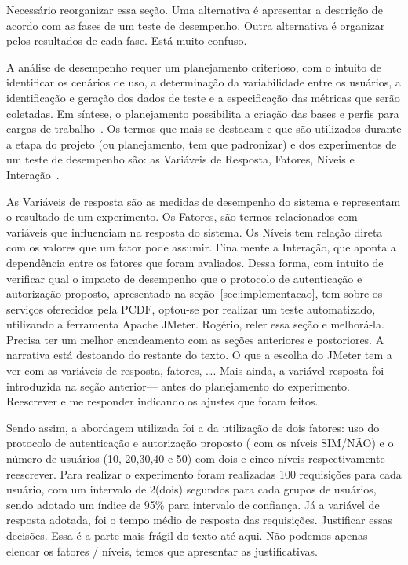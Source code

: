 {\color{red}Necess\'{a}rio reorganizar essa se\c c\~{a}o. Uma alternativa \'{e} apresentar a descri\c c\~{a}o de acordo com as fases de um teste de desempenho. Outra alternativa \'{e} organizar
pelos resultados de cada fase. Est\'{a} muito confuso.}

{\color{red}A an\'{a}lise de desempenho requer um planejamento criterioso, com o intuito de} identificar os cenários de uso, a determinação da variabilidade entre os usuários, a identificação e geração dos dados de teste e a especificação das métricas que serão coletadas. Em síntese, o planejamento possibilita a cria\c c\~{a}o das bases e
perfis para cargas de trabalho~\cite{Meier2007}. Os termos que mais se destacam e que são utilizados durante a etapa do {\color{red} projeto (ou planejamento, tem que padronizar)}
e dos experimentos de um teste de desempenho são: as Variáveis de Resposta, Fatores, Níveis e Interação~\cite{jain1991art}.

As Variáveis de resposta são as medidas de desempenho do sistema e representam o resultado de um experimento. Os Fatores, são termos relacionados com variáveis que influenciam na resposta do sistema. Os Níveis tem relação direta com os valores que um fator pode assumir. Finalmente a Interação, que aponta a dependência entre os fatores que foram avaliados.
Dessa forma, com intuito de verificar qual o impacto de desempenho que o protocolo de autenticação e autorização proposto, apresentado na seção~\ref{sec:implementacao}, tem sobre os serviços oferecidos pela PCDF, optou-se por realizar um teste automatizado, utilizando a ferramenta Apache JMeter. {\color{red}Rog\'{e}rio, reler essa se\c c\~{a}o e melhor\'{a}-la. Precisa
ter um melhor encadeamento com as se\c c\~{o}es anteriores e postoriores. A narrativa est\'{a} destoando do restante do texto. O que a escolha do JMeter tem a ver com as vari\'{a}veis de resposta, fatores, \ldots. Mais ainda, a vari\'{a}vel resposta foi introduzida na se\c c\~{a}o anterior--- antes do planejamento do experimento. Reescrever e me responder indicando os ajustes que foram feitos}.

Sendo assim, a abordagem utilizada foi a da utilização de dois fatores: uso do protocolo de autenticação e autorização proposto ({\color{red} com os n\'{i}veis SIM/NÃO})
e o número de usuários (10, 20,30,40 e 50) com dois e cinco níveis respectivamente {\color{red}reescrever}.
Para realizar o experimento foram realizadas 100 requisições para cada usuário, com um intervalo de 2(dois) segundos para cada grupos de usuários, sendo adotado um índice de 95\% para intervalo de confiança. Já a variável de resposta adotada, foi o tempo médio de resposta das requisições. {\color{red}Justificar essas decis\~{o}es. Essa \'{e} a parte mais fr\'{a}gil do texto
at\'{e} aqui. N\~{a}o podemos apenas elencar os fatores / n\'{i}veis, temos que apresentar as justificativas. }

